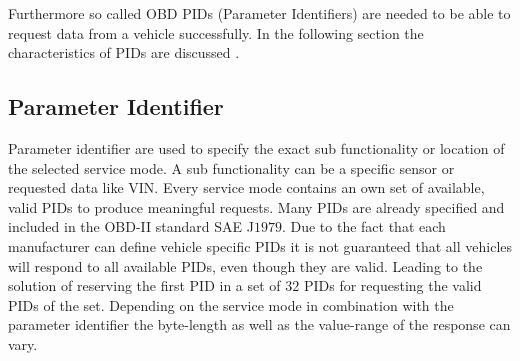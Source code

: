 Furthermore so called OBD PIDs (Parameter Identifiers) are needed to be able to request data from a vehicle successfully. In the following section 
the characteristics of PIDs are discussed \cite{SCHAFOBD1}.

\subsection*{Parameter Identifier}
Parameter identifier are used to specify the exact sub functionality or location of the selected service mode. A sub functionality can
be a specific sensor or requested data like VIN. Every service mode contains an own set of available, valid PIDs to produce meaningful requests. Many PIDs are 
already specified and included in the OBD-II standard SAE J$1979$. Due to the fact that each manufacturer can define vehicle specific PIDs it is not 
guaranteed that all vehicles will respond to all available PIDs, even though they are valid. Leading to the solution of reserving the first PID in a 
set of $32$ PIDs for requesting the valid PIDs of the set. Depending on the service mode in combination with the parameter identifier the byte-length 
as well as the value-range of the response can vary. 
